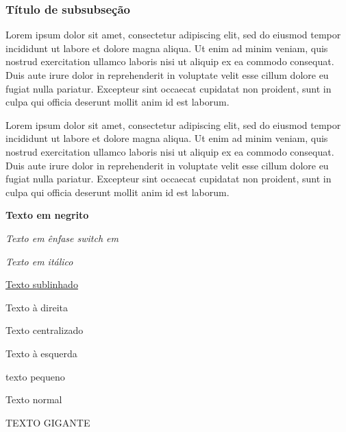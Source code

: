 \documentclass[12pt]{article}
\begin{document}
		\subsubsection{Título de subsubseção}
			Lorem ipsum dolor sit amet, consectetur adipiscing elit, sed do eiusmod tempor incididunt ut labore et dolore magna aliqua. Ut enim ad minim veniam, quis nostrud exercitation ullamco laboris nisi ut aliquip ex ea commodo consequat. Duis aute irure dolor in reprehenderit in voluptate velit esse cillum dolore eu fugiat nulla pariatur. Excepteur sint occaecat cupidatat non proident, sunt in culpa qui officia deserunt mollit anim id est laborum.
			
			Lorem ipsum dolor sit amet, consectetur adipiscing elit, sed do eiusmod tempor incididunt ut labore et dolore magna aliqua. Ut enim ad minim veniam, quis nostrud exercitation ullamco laboris nisi ut aliquip ex ea commodo consequat. Duis aute irure dolor in reprehenderit in voluptate velit esse cillum dolore eu fugiat nulla pariatur. Excepteur sint occaecat cupidatat non proident, sunt in culpa qui officia deserunt mollit anim id est laborum.
		\newpage %

	\textbf{Texto em negrito}
	
	{\em Texto em ênfase switch em}
	
	\textit{Texto em itálico}
	
	\underline{Texto sublinhado}
	
	\begin{flushright}
		Texto à direita
	\end{flushright}
	
	\begin{center}
		Texto centralizado
	\end{center}
	
	\begin{flushleft}
		Texto à esquerda
	\end{flushleft}
	
	\begin{tiny}
		texto pequeno
	\end{tiny}
	
	Texto normal
	
	{\Huge TEXTO GIGANTE}
	
	\newpage
	
\end{document}
